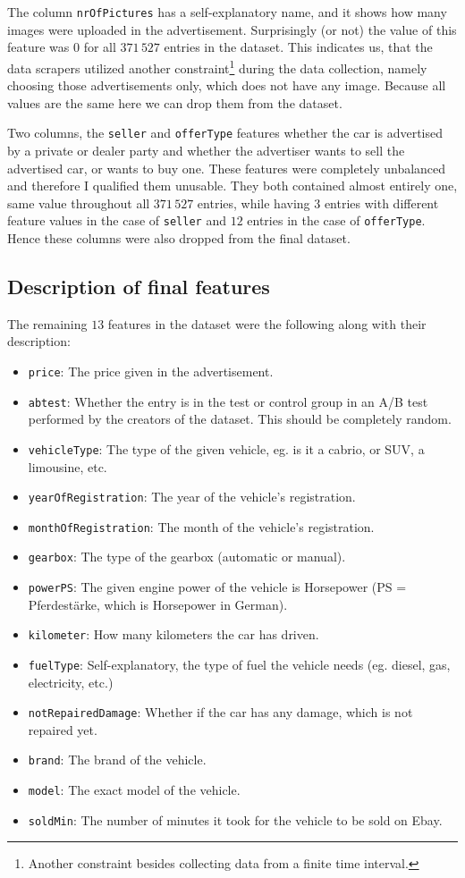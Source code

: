 The column \texttt{nrOfPictures} has a self-explanatory name, and it shows how many images were uploaded in the advertisement. Surprisingly (or not) the value of this feature was $0$ for all $371\,527$ entries in the dataset. This indicates us, that the data scrapers utilized another constraint\footnote{Another constraint besides collecting data from a finite time interval.} during the data collection, namely choosing those advertisements only, which does not have any image. Because all values are the same here we can drop them from the dataset.

Two columns, the \texttt{seller} and \texttt{offerType} features  whether the car is advertised by a private or dealer party and whether the advertiser wants to sell the advertised car, or wants to buy one. These features were completely unbalanced and therefore I qualified them unusable. They both contained almost entirely one, same value throughout all $371\,527$ entries, while having $3$ entries with different feature values in the case of \texttt{seller} and $12$ entries in the case of \texttt{offerType}. Hence these columns were also dropped from the final dataset.

\subsection{Description of final features}
The remaining $13$ features in the dataset were the following along with their description:
\begin{itemize}
	\item \texttt{price}: The price given in the advertisement.
	\item \texttt{abtest}: Whether the entry is in the test or control group in an A/B test performed by the creators of the dataset. This should be completely random.
	\item \texttt{vehicleType}: The type of the given vehicle, eg. is it a cabrio, or SUV, a limousine, etc. 
	\item \texttt{yearOfRegistration}: The year of the vehicle's registration.
	\item \texttt{monthOfRegistration}: The month of the vehicle's registration.
	\item \texttt{gearbox}: The type of the gearbox (automatic or manual).
	\item \texttt{powerPS}: The given engine power of the vehicle is Horsepower (PS = Pferdestärke, which is Horsepower in German).
	\item \texttt{kilometer}: How many kilometers the car has driven.
	\item \texttt{fuelType}: Self-explanatory, the type of fuel the vehicle needs (eg. diesel, gas, electricity, etc.)
	\item \texttt{notRepairedDamage}: Whether if the car has any damage, which is not repaired yet.
	\item \texttt{brand}: The brand of the vehicle.
	\item \texttt{model}: The exact model of the vehicle.
	\item \texttt{soldMin}: The number of minutes it took for the vehicle to be sold on Ebay.
\end{itemize}

